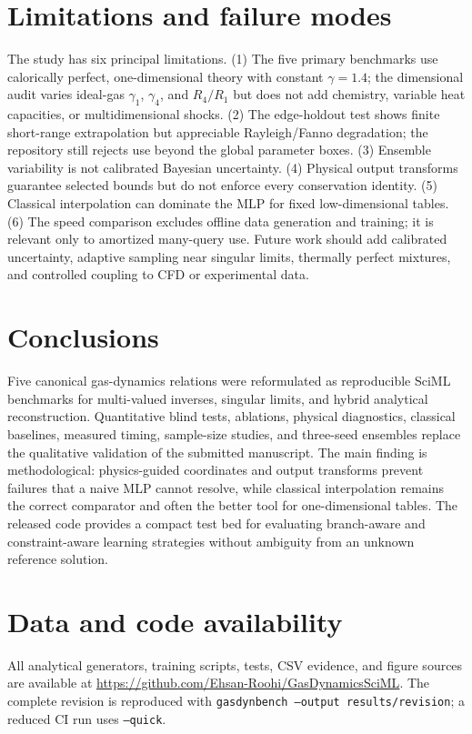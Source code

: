 \documentclass[11pt]{article}
\newenvironment{revision}{\color{revisionblue}}{}
\newenvironment{revision}{}{}
\begin{document}
\begin{revision}
\section{Limitations and failure modes}
The study has six principal limitations. (1) The five primary benchmarks use calorically perfect, one-dimensional theory with constant $\gamma=1.4$; the dimensional audit varies ideal-gas $\gamma_1$, $\gamma_4$, and $R_4/R_1$ but does not add chemistry, variable heat capacities, or multidimensional shocks. (2) The edge-holdout test shows finite short-range extrapolation but appreciable Rayleigh/Fanno degradation; the repository still rejects use beyond the global parameter boxes. (3) Ensemble variability is not calibrated Bayesian uncertainty. (4) Physical output transforms guarantee selected bounds but do not enforce every conservation identity. (5) Classical interpolation can dominate the MLP for fixed low-dimensional tables. (6) The speed comparison excludes offline data generation and training; it is relevant only to amortized many-query use. Future work should add calibrated uncertainty, adaptive sampling near singular limits, thermally perfect mixtures, and controlled coupling to CFD or experimental data.

\section{Conclusions}
Five canonical gas-dynamics relations were reformulated as reproducible SciML benchmarks for multi-valued inverses, singular limits, and hybrid analytical reconstruction. Quantitative blind tests, ablations, physical diagnostics, classical baselines, measured timing, sample-size studies, and three-seed ensembles replace the qualitative validation of the submitted manuscript. The main finding is methodological: physics-guided coordinates and output transforms prevent failures that a naive MLP cannot resolve, while classical interpolation remains the correct comparator and often the better tool for one-dimensional tables. The released code provides a compact test bed for evaluating branch-aware and constraint-aware learning strategies without ambiguity from an unknown reference solution.

\section*{Data and code availability}
All analytical generators, training scripts, tests, CSV evidence, and figure sources are available at \url{https://github.com/Ehsan-Roohi/GasDynamicsSciML}. The complete revision is reproduced with \texttt{gasdynbench --output results/revision}; a reduced CI run uses \texttt{--quick}.


\end{revision}
\end{document}
